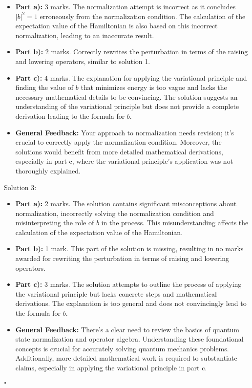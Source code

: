 \documentclass[a4paper,11pt]{article}
\begin{document}
\begin{itemize}
    \item \textbf{Part a):} 3 marks. The normalization attempt is incorrect as it concludes \(|b|^2 = 1\) erroneously from the normalization condition. The calculation of the expectation value of the Hamiltonian is also based on this incorrect normalization, leading to an inaccurate result.
    \item \textbf{Part b):} 2 marks. Correctly rewrites the perturbation in terms of the raising and lowering operators, similar to solution 1.
    \item \textbf{Part c):} 4 marks. The explanation for applying the variational principle and finding the value of \(b\) that minimizes energy is too vague and lacks the necessary mathematical details to be convincing. The solution suggests an understanding of the variational principle but does not provide a complete derivation leading to the formula for \(b\).
    \item \textbf{General Feedback:} Your approach to normalization needs revision; it's crucial to correctly apply the normalization condition. Moreover, the solutions would benefit from more detailed mathematical derivations, especially in part c, where the variational principle's application was not thoroughly explained.
\end{itemize}

Solution 3:

\begin{itemize}
    \item \textbf{Part a):} 2 marks. The solution contains significant misconceptions about normalization, incorrectly solving the normalization condition and misinterpreting the role of \(b\) in the process. This misunderstanding affects the calculation of the expectation value of the Hamiltonian.
    \item \textbf{Part b):} 1 mark. This part of the solution is missing, resulting in no marks awarded for rewriting the perturbation in terms of raising and lowering operators.
    \item \textbf{Part c):} 3 marks. The solution attempts to outline the process of applying the variational principle but lacks concrete steps and mathematical derivations. The explanation is too general and does not convincingly lead to the formula for \(b\).
    \item \textbf{General Feedback:} There's a clear need to review the basics of quantum state normalization and operator algebra. Understanding these foundational concepts is crucial for accurately solving quantum mechanics problems. Additionally, more detailed mathematical work is required to substantiate claims, especially in applying the variational principle in part c.
\end{itemize}
"
\end{document}

